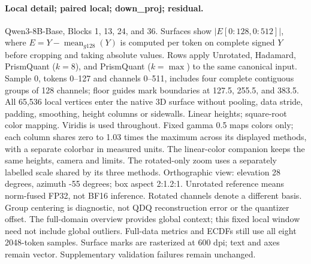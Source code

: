 \paragraph{Local detail; paired local; down\_proj; residual.} Qwen3-8B-Base, Blocks 1, 13, 24, and 36. Surfaces show $|E[0:128,0:512]|$, where $E=Y-\operatorname{mean}_{g128}(Y)$ is computed per token on complete signed $Y$ before cropping and taking absolute values. Rows apply Unrotated, Hadamard, PrismQuant ($k=8$), and PrismQuant ($k=\max$) to the same canonical input. Sample 0, tokens 0--127 and channels 0--511, includes four complete contiguous groups of 128 channels; floor guides mark boundaries at 127.5, 255.5, and 383.5. All 65,536 local vertices enter the native 3D surface without pooling, data stride, padding, smoothing, height columns or sidewalls. Linear heights; square-root color mapping. Viridis is used throughout. Fixed gamma 0.5 maps colors only; each column shares zero to 1.03 times the maximum across its displayed methods, with a separate colorbar in measured units. The linear-color companion keeps the same heights, camera and limits. The rotated-only zoom uses a separately labelled scale shared by its three methods. Orthographic view: elevation 28 degrees, azimuth -55 degrees; box aspect 2:1.2:1. Unrotated reference means norm-fused FP32, not BF16 inference. Rotated channels denote a different basis. Group centering is diagnostic, not QDQ reconstruction error or the quantizer offset. The full-domain overview provides global context; this fixed local window need not include global outliers. Full-data metrics and ECDFs still use all eight 2048-token samples. Surface marks are rasterized at 600 dpi; text and axes remain vector. Supplementary validation failures remain unchanged.

